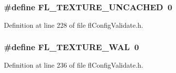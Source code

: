 \subsubsection{\setlength{\rightskip}{0pt plus 5cm}\#define FL\_\-TEXTURE\_\-UNCACHED~0}\label{flConfigValidate_8h_19e91ca240a0e8d4097fdff7e7e1ab2b}




Definition at line 228 of file fl\-Config\-Validate.h.
\subsubsection{\setlength{\rightskip}{0pt plus 5cm}\#define FL\_\-TEXTURE\_\-WAL~0}\label{flConfigValidate_8h_afcc051020cb5d1a2eedd6399c382807}




Definition at line 236 of file fl\-Config\-Validate.h.
